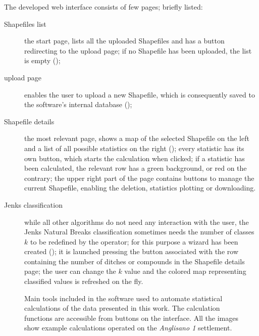             The developed web interface consists of few pages; briefly listed:

            \begin{description}
                \item[Shapefiles list] the start page, lists all the uploaded Shapefiles and has a button redirecting to the upload page; if no Shapefile has been uploaded, the list is empty ();
                \item[upload page] enables the user to upload a new Shapefile, which is consequently saved to the software's internal database ();
                \item[Shapefile details] the most relevant page, shows a map of the selected Shapefile on the left and a list of all possible statistics on the right (); every statistic has its own button, which starts the calculation when clicked; if a statistic has been calculated, the relevant row has a green background, or red on the contrary; the upper right part of the page contains buttons to manage the current Shapefile, enabling the deletion, statistics plotting or downloading.
                \item[Jenks classification] while all other algorithms do not need any interaction with the user, the Jenks Natural Breaks classification sometimes needs the number of classes $k$ to be redefined by the operator; for this purpose a wizard has been created (); it is launched pressing the button associated with the row containing the number of ditches or compounds in the Shapefile details page; the user can change the $k$ value and the colored map representing classified values is refreshed on the fly.
            \end{description}

            \pagebreak

            \vfill

            \begin{figure}[H]
                \caption[Screenshots of the main tools of the software created to automate statistical calculations.]{Main tools included in the software used to automate statistical calculations of the data presented in this work. The calculation functions are accessible from buttons on the interface. All the images show example calculations operated on the \emph{Anglisano 1} settlement.}
                \label{fig:screenshots}
            \end{figure}


